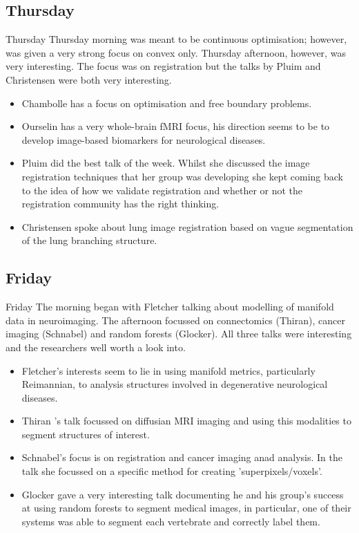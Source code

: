\documentclass[11pt]{beamer}
\begin{document}
\subsection{Thursday}
\begin{frame}{Thursday}
	Thursday morning was meant to be continuous optimisation; however, was given a very strong focus on convex only.
	Thursday afternoon, however, was very interesting. The focus was on registration but the talks by Pluim and Christensen were both very interesting.
\end{frame}
\begin{frame} 
  \begin{itemize}
  \item Chambolle has a focus on optimisation and free boundary problems.
  \item Ourselin has a very whole-brain fMRI focus, his direction seems to be to develop image-based biomarkers for neurological diseases.
  \item Pluim did the best talk of the week. Whilst she discussed the image registration techniques that her group was developing she kept coming back to the idea of how we validate registration and whether or not the registration community has the right thinking.
  \item Christensen spoke about lung image registration based on vague segmentation of the lung branching structure.
  \end{itemize}
\end{frame}

\subsection{Friday}
\begin{frame}{Friday}
	The morning began with Fletcher talking about modelling of manifold data in neuroimaging.
	The afternoon focussed on connectomics (Thiran), cancer imaging (Schnabel) and random forests (Glocker). All three talks were interesting and the researchers well worth a look into.
\end{frame}
\begin{frame} 
  \begin{itemize}
  \item Fletcher's interests seem  to lie in using manifold metrics, particularly Reimannian, to analysis structures involved in degenerative neurological diseases.
  \item Thiran 's talk focussed on diffusian MRI imaging and using this modalities to segment structures of interest.
  \item Schnabel's focus is on registration and cancer imaging anad analysis. In the talk she focussed on a specific method for creating 'superpixels/voxels'.
  \item Glocker gave a very interesting talk documenting he and his group's success at using random forests to segment medical images, in particular, one of their systems was able to segment each vertebrate and correctly label them.
  \end{itemize}
\end{frame}
\end{document}
